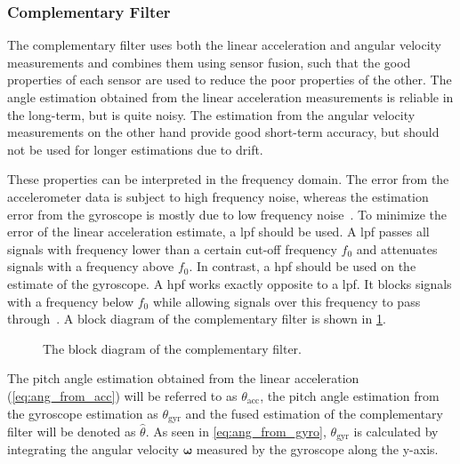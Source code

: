 \subsubsection{Complementary Filter}
The complementary filter uses both the linear acceleration and angular velocity measurements and combines them using sensor fusion, such that the good properties of each sensor are used to reduce the poor properties of the other.
The angle estimation obtained from the linear acceleration measurements is reliable in the long-term, but is quite noisy.
The estimation from the angular velocity measurements on the other hand provide good short-term accuracy, but should not be used for longer estimations due to drift.

These properties can be interpreted in the frequency domain.
The error from the accelerometer data is subject to high frequency noise, whereas the estimation error from the gyroscope is mostly due to low frequency noise~\cite{2007Colton}.
To minimize the error of the linear acceleration estimate, a \gls{lpf} should be used.
A \gls{lpf} passes all signals with frequency lower than a certain cut-off frequency $f_0$ and attenuates signals with a frequency above $f_0$.
In contrast, a \gls{hpf} should be used on the estimate of the gyroscope.
A \gls{hpf} works exactly opposite to a \gls{lpf}.
It blocks signals with a frequency below $f_0$ while allowing signals over this frequency to pass through~\cite{Lyons1996}. A block diagram of the complementary filter is shown in \cref{fig:tikz_complementary_filter}.

\begin{figure}[htb]
    \centering
    
    \caption[Block diagram of the complementary filter]{The block diagram of the complementary filter.}
    \label{fig:tikz_complementary_filter}
\end{figure}
The pitch angle estimation obtained from the linear acceleration (\cref{eq:ang_from_acc}) will be referred to as $\theta_\mathrm{acc}$, the pitch angle estimation from the gyroscope estimation as $\theta_\mathrm{gyr}$ and the fused estimation of the complementary filter will be denoted as $\hat{\theta}$.
As seen in \cref{eq:ang_from_gyro}, $\theta_\mathrm{gyr}$ is calculated by integrating the angular velocity $\boldsymbol{\omega} $ measured by the gyroscope along the y-axis.

